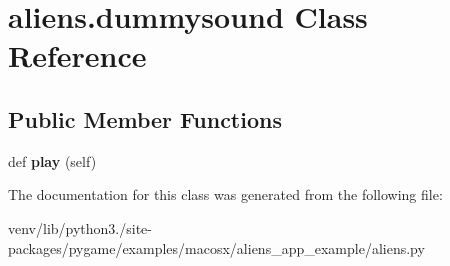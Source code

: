 \hypertarget{classaliens_1_1dummysound}{}\section{aliens.\+dummysound Class Reference}
\label{classaliens_1_1dummysound}
\subsection*{Public Member Functions}
\begin{DoxyCompactItemize}
\item 
\mbox{\label{classaliens_1_1dummysound_a67b02f6a9c24229bbafffffcede8bcba}} 
def {\bfseries play} (self)
\end{DoxyCompactItemize}


The documentation for this class was generated from the following file\+:\begin{DoxyCompactItemize}
\item 
venv/lib/python3./site-\/packages/pygame/examples/macosx/aliens\+\_\+app\+\_\+example/aliens.\+py\end{DoxyCompactItemize}
